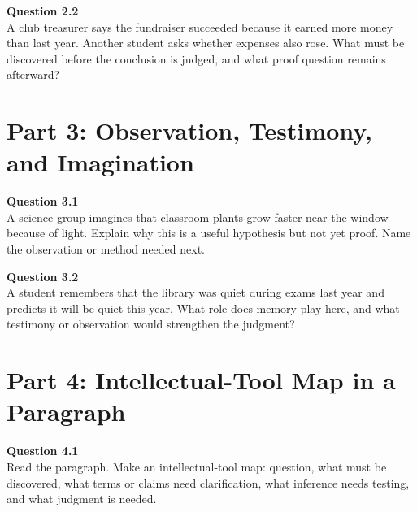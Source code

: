 \documentclass[12pt]{article}
\begin{document}
\textbf{Question 2.2}\\[-0.15em]
A club treasurer says the fundraiser succeeded because it earned more money than last year. Another student asks whether expenses also rose. What must be discovered before the conclusion is judged, and what proof question remains afterward?


\newpage

\section*{Part 3: Observation, Testimony, and Imagination}

\textbf{Question 3.1}\\[-0.15em]
A science group imagines that classroom plants grow faster near the window because of light. Explain why this is a useful hypothesis but not yet proof. Name the observation or method needed next.


\textbf{Question 3.2}\\[-0.15em]
A student remembers that the library was quiet during exams last year and predicts it will be quiet this year. What role does memory play here, and what testimony or observation would strengthen the judgment?


\newpage

\section*{Part 4: Intellectual-Tool Map in a Paragraph}

\textbf{Question 4.1}\\[-0.15em]
Read the paragraph. Make an intellectual-tool map: question, what must be discovered, what terms or claims need clarification, what inference needs testing, and what judgment is needed.

\vspace{0.2em}

\noindent{}
\end{document}
